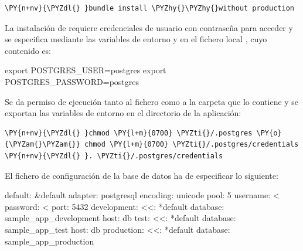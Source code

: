 \begin{framed_shaded}
\begin{Verbatim}[fontsize=\relsize{-2.5},fontseries=b,commandchars=\\\{\}]
\PY{n+nv}{\PYZdl{} }bundle install \PYZhy{}\PYZhy{}without production
\end{Verbatim}
\end{framed_shaded}

La instalación de  requiere credenciales de usuario con contraseña para acceder y se especifica mediante las variables de entorno  y  en el fichero local , cuyo contenido es:

\begin{codelisting}
\label{code:credentials}
\begin{code}
export POSTGRES_USER=postgres
export POSTGRES_PASSWORD=postgres
\end{code}
\end{codelisting}

Se da permiso de ejecución tanto al fichero como a la carpeta que lo contiene y se exportan las variables de entorno en el directorio de la aplicación:

\begin{framed_shaded}
\begin{Verbatim}[fontsize=\relsize{-2.5},fontseries=b,commandchars=\\\{\}]
\PY{n+nv}{\PYZdl{} }chmod \PY{l+m}{0700} \PYZti{}/.postgres \PY{o}{\PYZam{}\PYZam{}} chmod \PY{l+m}{0700} \PYZti{}/.postgres/credentials
\PY{n+nv}{\PYZdl{} }. \PYZti{}/.postgres/credentials
\end{Verbatim}
\end{framed_shaded}

El fichero de configuración de la base de datos ha de especificar lo siguiente:

\begin{codelisting}
\label{code:database}
\begin{code}
default: &default
  adapter: postgresql
  encoding: unicode
  pool: 5
  username: <%
  password: <%
  port: 5432
development:
  <<: *default
  database: sample_app_development  
  host: db
test:
  <<: *default
  database: sample_app_test
  host: db
production:
  <<: *default
  database: sample_app_production
\end{code}
\end{codelisting}

